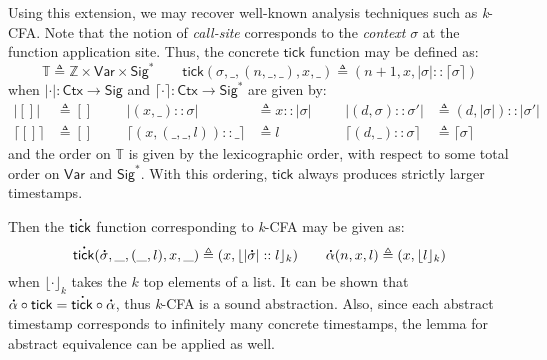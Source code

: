 \documentclass[acmsmall,screen,review]{acmart}\settopmatter{printfolios=true,printccs=false,printacmref=false}
\theoremstyle{acmdefinition}
\newcommand*{\cons}{::}
\newcommand*{\A}[1]{\overset{\,_{\mbox{\Large .}}}{#1}}
\newcommand*{\ExprVar}{\mathsf{Var}}
\newcommand*{\modid}{d}
\newcommand*{\Time}{\mathbb{T}}
\newcommand*{\ctx}{\sigma}
\newcommand*{\Ctx}{\mathsf{Ctx}}
\newcommand*{\Sig}{\mathsf{Sig}}
\newcommand*{\tick}{\mathsf{tick}}
\begin{document}
Using this extension, we may recover well-known analysis techniques such as \emph{k}-CFA.
Note that the notion of \emph{call-site} corresponds to the \emph{context} $\ctx$ at the function application site.
Thus, the concrete $\tick$ function may be defined as:
\[\Time\triangleq\mathbb{Z}\times\ExprVar\times\Sig^*\qquad\tick(\ctx,\_,(n,\_,\_),x,\_)\triangleq(n+1,x,|\ctx|\cons\lceil\ctx\rceil)\]
when $|\cdot|:\Ctx\rightarrow\Sig$ and $\lceil\cdot\rceil:\Ctx\rightarrow\Sig^*$ are given by:
\begin{align*}
  |[]|           & \triangleq [] &  &  & |(x,\_)\cons\ctx|                & \triangleq x\cons|\ctx| &  &  & |(\modid,\ctx)\cons\ctx'|        & \triangleq(\modid,|\ctx|)\cons|\ctx'| \\
  \lceil[]\rceil & \triangleq [] &  &  & \lceil(x,(\_,\_,l))\cons\_\rceil & \triangleq l            &  &  & \lceil(\modid,\_)\cons\ctx\rceil & \triangleq\lceil\ctx\rceil
\end{align*}
and the order on $\Time$ is given by the lexicographic order, with respect to some total order on $\ExprVar$ and $\Sig^*$.
With this ordering, $\tick$ always produces strictly larger timestamps.

Then the $\A\tick$ function corresponding to \emph{k}-CFA may be given as:
\[\A\tick(\A\ctx,\_,(\_,l),x,\_)\triangleq(x,\lfloor|\A\ctx|\cons l\rfloor_k)\qquad\A\alpha(n,x,l)\triangleq(x,\lfloor l\rfloor_k)\]
when $\lfloor\cdot\rfloor_k$ takes the $k$ top elements of a list.
It can be shown that $\A\alpha\circ\tick=\A\tick\circ\A\alpha$, thus \emph{k}-CFA is a sound abstraction.
Also, since each abstract timestamp corresponds to infinitely many concrete timestamps, the lemma for abstract equivalence can be applied as well.
\end{document}
